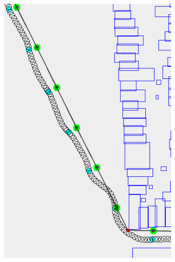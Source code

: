 \begin{figure}[h]
	\centering
	
	\begin{subfigure}[t]{.4\textwidth}
        		\includegraphics[width=\textwidth]{img/sf-wavy2}
        		\caption{}
        		\label{fig:sf-wavy2}
	\end{subfigure}
	\hfill
	\begin{subfigure}[t]{.4\textwidth}

\end{subfigure}
\end{figure}
